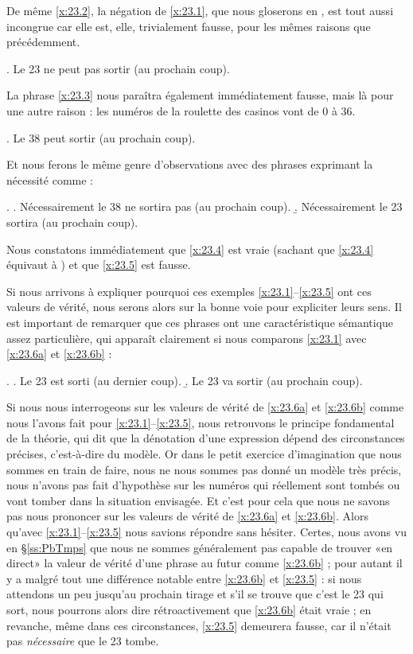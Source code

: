 De même \ref{x:23.2}, la négation de \ref{x:23.1}, que nous gloserons en , est tout aussi incongrue  car elle est,
elle, trivialement fausse, pour les mêmes raisons que précédemment.

\ex.  \label{x:23.2}
Le 23 ne peut pas sortir (au prochain coup).


La phrase \ref{x:23.3} nous paraîtra également immédiatement fausse, mais là pour une autre raison : les
numéros de la roulette des casinos vont de 0 à 36.

\ex.  \label{x:23.3}
Le 38 peut sortir (au prochain coup).


Et nous ferons le même genre d'observations avec des phrases exprimant la
nécessité comme :

\ex.  
\a.
Nécessairement le 38 ne sortira pas (au prochain coup).\label{x:23.4}
\b.  
Nécessairement le 23  sortira (au prochain coup).\label{x:23.5}

Nous constatons immédiatement que \ref{x:23.4}  est vraie (sachant que \ref{x:23.4} équivaut à ) et que
\ref{x:23.5} est fausse. 

Si nous arrivons à expliquer pourquoi ces exemples
\ref{x:23.1}--\ref{x:23.5} ont ces valeurs de vérité, nous serons
alors sur la bonne voie pour expliciter leurs sens.  
Il est important de remarquer que ces phrases ont une caractéristique
sémantique assez particulière, qui apparaît clairement si nous
comparons \ref{x:23.1} avec \ref{x:23.6a} et \ref{x:23.6b} :

\ex.   \label{x:23.6}
\a. Le 23 est sorti (au dernier coup).\label{x:23.6a}
\b. Le 23 va sortir (au prochain coup).\label{x:23.6b}


\label{ss:possnec-wdep}
Si nous nous interrogeons sur les valeurs de vérité de \ref{x:23.6a} et
\ref{x:23.6b} comme nous l'avons fait pour
\ref{x:23.1}--\ref{x:23.5}, nous retrouvons le principe
fondamental de la théorie, qui dit que la dénotation d'une expression
dépend des circonstances précises, c'est-à-dire du modèle. Or dans le petit exercice d'imagination que nous sommes en train de faire, nous ne nous sommes pas donné un modèle très précis, nous n'avons pas fait d'hypothèse sur les numéros qui réellement sont tombés ou vont tomber dans la situation envisagée. Et c'est
 pour cela que nous ne savons pas nous prononcer sur les
valeurs de vérité de \ref{x:23.6a} et \ref{x:23.6b}.  Alors qu'avec
\ref{x:23.1}--\ref{x:23.5} nous savions répondre sans hésiter.  
Certes, nous avons vu en \S\ref{ss:PbTmps} que nous ne sommes généralement pas capable de trouver «en direct» la valeur de vérité d'une phrase au futur comme \ref{x:23.6b} ; pour autant il y a malgré tout une différence notable entre \ref{x:23.6b} et \ref{x:23.5} : si nous attendons un peu jusqu'au prochain tirage et s'il se trouve que c'est le 23 qui sort, nous pourrons alors dire rétroactivement que \ref{x:23.6b} était vraie ; en revanche, même dans ces circonstances, \ref{x:23.5} demeurera fausse, car il n'était pas \emph{nécessaire} que le 23 tombe. 


